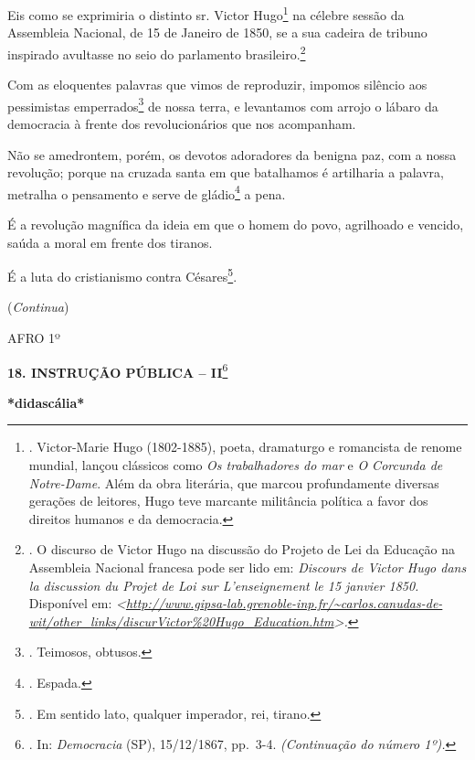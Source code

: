Eis como se exprimiria o distinto sr. Victor Hugo\footnote{.
  Victor-Marie Hugo (1802-1885), poeta, dramaturgo e romancista de
  renome mundial, lançou clássicos como \emph{Os trabalhadores do mar} e
  \emph{O Corcunda de Notre-Dame}. Além da obra literária, que marcou
  profundamente diversas gerações de leitores, Hugo teve marcante
  militância política a favor dos direitos humanos e da democracia.} na
célebre sessão da Assembleia Nacional, de 15 de Janeiro de 1850, se a
sua cadeira de tribuno inspirado avultasse no seio do parlamento
brasileiro.\footnote{. O discurso de Victor Hugo na discussão do Projeto
  de Lei da Educação na Assembleia Nacional francesa pode ser lido em:
  \emph{Discours de Victor Hugo dans la discussion du Projet de Loi sur
  L'enseignement le 15 janvier 1850.} Disponível em:
  \emph{\textless{}\url{http://www.gipsa-lab.grenoble-inp.fr/~carlos.canudas-de-wit/other_links/discurVictor\%20Hugo_Education.htm}\textgreater.}}

Com as eloquentes palavras que vimos de reproduzir, impomos silêncio aos
pessimistas emperrados\footnote{. Teimosos, obtusos.} de nossa terra, e
levantamos com arrojo o lábaro da democracia à frente dos
revolucionários que nos acompanham.

Não se amedrontem, porém, os devotos adoradores da benigna paz, com a
nossa revolução; porque na cruzada santa em que batalhamos é artilharia
a palavra, metralha o pensamento e serve de gládio\footnote{. Espada.} a
pena.

É a revolução magnífica da ideia em que o homem do povo, agrilhoado e
vencido, saúda a moral em frente dos tiranos.

É a luta do cristianismo contra Césares\footnote{. Em sentido lato,
  qualquer imperador, rei, tirano.}.

(\emph{Continua})

AFRO 1º

\textbf{18. INSTRUÇÃO PÚBLICA -- II}\footnote{. In: \emph{Democracia}
  (SP), 15/12/1867, pp.~3-4. \emph{(Continuação do número 1º).}}

\textbf{*didascália*}

